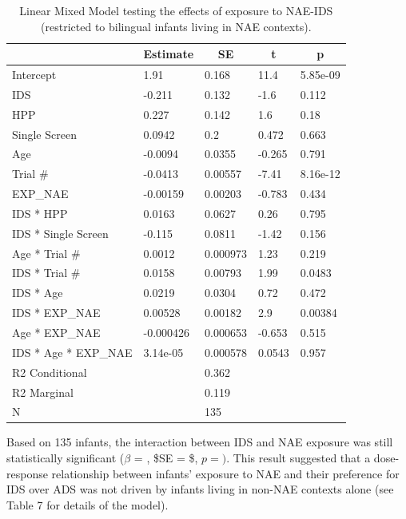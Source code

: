 \documentclass[,man,floatsintext]{apa6}
\begin{document}
\begin{table}[tbp]
\begin{center}
\begin{threeparttable}
\caption{\label{tab:unnamed-chunk-16}Linear Mixed Model testing the effects of exposure to NAE-IDS (restricted to bilingual infants living in NAE contexts).}
\begin{tabular}{lllll}
\toprule
 & \multicolumn{1}{c}{Estimate} & \multicolumn{1}{c}{SE} & \multicolumn{1}{c}{t} & \multicolumn{1}{c}{p}\\
\midrule
Intercept & 1.91 & 0.168 & 11.4 & 5.85e-09\\
IDS & -0.211 & 0.132 & -1.6 & 0.112\\
HPP & 0.227 & 0.142 & 1.6 & 0.18\\
Single Screen & 0.0942 & 0.2 & 0.472 & 0.663\\
Age & -0.0094 & 0.0355 & -0.265 & 0.791\\
Trial \# & -0.0413 & 0.00557 & -7.41 & 8.16e-12\\
EXP\_NAE & -0.00159 & 0.00203 & -0.783 & 0.434\\
IDS * HPP & 0.0163 & 0.0627 & 0.26 & 0.795\\
IDS * Single Screen & -0.115 & 0.0811 & -1.42 & 0.156\\
Age * Trial \# & 0.0012 & 0.000973 & 1.23 & 0.219\\
IDS * Trial \# & 0.0158 & 0.00793 & 1.99 & 0.0483\\
IDS * Age & 0.0219 & 0.0304 & 0.72 & 0.472\\
IDS * EXP\_NAE & 0.00528 & 0.00182 & 2.9 & 0.00384\\
Age * EXP\_NAE & -0.000426 & 0.000653 & -0.653 & 0.515\\
IDS * Age * EXP\_NAE & 3.14e-05 & 0.000578 & 0.0543 & 0.957\\ \midrule
R2 Conditional &  & 0.362 &  & \\
R2 Marginal &  & 0.119 &  & \\ \midrule
N &  & 135 &  & \\
\bottomrule
\end{tabular}
\end{threeparttable}
\end{center}
\end{table}

Based on 135 infants, the interaction between IDS and NAE exposure was still statistically significant (\(\beta\) = , \$SE = \$, \(p = )\). This result suggested that a dose-response relationship between infants' exposure to NAE and their preference for IDS over ADS was not driven by infants living in non-NAE contexts alone (see Table 7 for details of the model).
\end{document}
